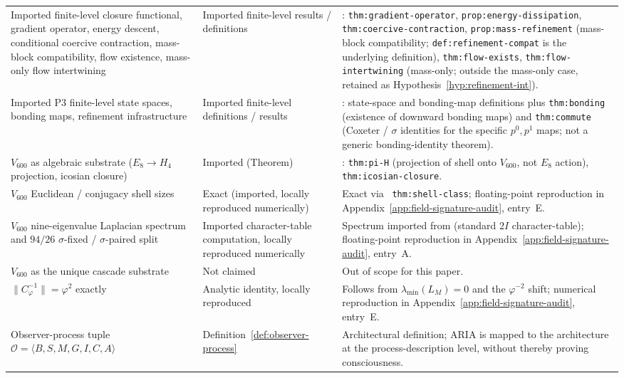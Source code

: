 \documentclass[11pt]{article}
\theoremstyle{definition}
\newcommand{\pphi}{\varphi}
\newcommand{\Ocal}{\mathcal{O}}
\newcommand{\Vsub}{V_{600}}
\newcommand{\Cphi}{C_{\pphi}}
\begin{document}
\begin{longtable}{>{\raggedright\arraybackslash}p{}>{\raggedright\arraybackslash}p{}>{\raggedright\arraybackslash}p{}}
Imported finite-level closure functional, gradient operator, energy descent, conditional coercive contraction, mass-block compatibility, flow existence, mass-only flow intertwining
& Imported finite-level results / definitions
& \cite{CascadeClosureDynamics}: \texttt{thm:gradient-operator}, \texttt{prop:energy-dissipation}, \texttt{thm:coercive-contraction}, \texttt{prop:mass-refinement} (mass-block compatibility; \texttt{def:refinement-compat} is the underlying definition), \texttt{thm:flow-exists}, \texttt{thm:flow-intertwining} (mass-only; outside the mass-only case, retained as Hypothesis~\ref{hyp:refinement-int}). \\
Imported P3 finite-level state spaces, bonding maps, refinement infrastructure
& Imported finite-level definitions / results
& \cite{CascadeRefinementSpaces}: state-space and bonding-map definitions plus \texttt{thm:bonding} (existence of downward bonding maps) and \texttt{thm:commute} (Coxeter / $\sigma$ identities for the specific $p^0, p^1$ maps; not a generic bonding-identity theorem). \\
$\Vsub$ as algebraic substrate ($E_8 \to H_4$ projection, icosian closure)
& Imported (Theorem)
& \cite{CascadeAlgSubstrate}: \texttt{thm:pi-H} (projection of shell onto $\Vsub$, not $E_8$ action), \texttt{thm:icosian-closure}. \\
$\Vsub$ Euclidean / conjugacy shell sizes
& Exact (imported, locally reproduced numerically)
& Exact via \cite{CascadeAlgSubstrate}~\texttt{thm:shell-class}; floating-point reproduction in Appendix~\ref{app:field-signature-audit}, entry~E. \\
$\Vsub$ nine-eigenvalue Laplacian spectrum and $94/26$ $\sigma$-fixed / $\sigma$-paired split
& Imported character-table computation, locally reproduced numerically
& Spectrum imported from \cite{CascadeAlgSubstrate} (standard $2I$ character-table); floating-point reproduction in Appendix~\ref{app:field-signature-audit}, entry~A. \\
$\Vsub$ as the unique cascade substrate
& Not claimed
& Out of scope for this paper. \\
$\|\Cphi^{-1}\| = \pphi^2$ exactly
& Analytic identity, locally reproduced
& Follows from $\lambda_{\min}(L_M) = 0$ and the $\pphi^{-2}$ shift; numerical reproduction in Appendix~\ref{app:field-signature-audit}, entry~E. \\
Observer-process tuple $\Ocal = \langle B,S,M,G,I,C,A\rangle$
& Definition~\ref{def:observer-process}
& Architectural definition; ARIA is mapped to the architecture at the process-description level, without thereby proving consciousness. \\

\end{longtable}
\end{document}
